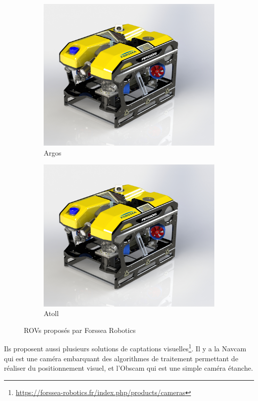     \begin{figure}[!htb]
        \centering
        \begin{subfigure}[b]{0.45\textwidth}
            \centering
            \includegraphics[width=\textwidth]{imgs/Argos.jpg}
            \caption{\gls{Argos}}
        \end{subfigure}
        \hfill
        \begin{subfigure}[b]{0.45\textwidth}
            \centering
            \includegraphics[width=\textwidth]{imgs/Argos.jpg}
            \caption{\gls{Atoll}}
        \end{subfigure}
        \caption{\gls{ROV}s proposés par Forssea Robotics}
    \end{figure}

    Ils proposent aussi plusieurs solutions de captations visuelles\footnote{\url{https://forssea-robotics.fr/index.php/products/cameras}}. Il y a la \gls{Navcam} qui est une caméra embarquant des algorithmes de traitement permettant de réaliser du positionnement visuel, et l'\gls{Obscam} qui est une simple caméra étanche.